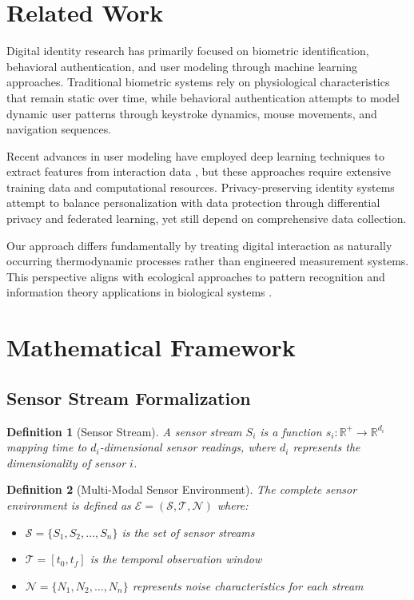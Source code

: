 \documentclass[12pt,a4paper]{article}
\newtheorem{definition}{Definition}
\begin{document}
\section{Related Work}

Digital identity research has primarily focused on biometric identification, behavioral authentication, and user modeling through machine learning approaches. Traditional biometric systems \cite{jain2007handbook} rely on physiological characteristics that remain static over time, while behavioral authentication \cite{yampolskiy2008behavioural} attempts to model dynamic user patterns through keystroke dynamics, mouse movements, and navigation sequences.

Recent advances in user modeling have employed deep learning techniques to extract features from interaction data \cite{shen2019comprehensive}, but these approaches require extensive training data and computational resources. Privacy-preserving identity systems \cite{wang2019survey} attempt to balance personalization with data protection through differential privacy and federated learning, yet still depend on comprehensive data collection.

Our approach differs fundamentally by treating digital interaction as naturally occurring thermodynamic processes rather than engineered measurement systems. This perspective aligns with ecological approaches to pattern recognition \cite{gibson2014ecological} and information theory applications in biological systems \cite{krakauer2020worlds}.

\section{Mathematical Framework}

\subsection{Sensor Stream Formalization}

\begin{definition}[Sensor Stream]
A sensor stream $S_i$ is a function $s_i: \mathbb{R}^+ \rightarrow \mathbb{R}^{d_i}$ mapping time to $d_i$-dimensional sensor readings, where $d_i$ represents the dimensionality of sensor $i$.
\end{definition}

\begin{definition}[Multi-Modal Sensor Environment]
The complete sensor environment is defined as $\mathcal{E} = (\mathcal{S}, \mathcal{T}, \mathcal{N})$ where:
\begin{itemize}
\item $\mathcal{S} = \{S_1, S_2, \ldots, S_n\}$ is the set of sensor streams
\item $\mathcal{T} = [t_0, t_f]$ is the temporal observation window
\item $\mathcal{N} = \{N_1, N_2, \ldots, N_n\}$ represents noise characteristics for each stream
\end{itemize}
\end{definition}
\end{document}
